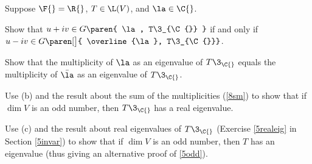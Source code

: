 \exercise
Suppose $\F{} = \R{}$, $T \in \L(V)$, and $\la \in \C{}$.\label{8compmult}
\begin{subtheorem}
\item
Show that $u + iv \in G\paren{ \la, T\3_{\C{}} }$ if and only if $u - iv \in G\paren[\big]{ \overline{\la}, T\3_{\C{}}}$.
\item
Show that the multiplicity of $\la$ as an eigenvalue of $T\3_{\C{}}$ equals the \mbox{multiplicity} of $\bar{\la}$ as an eigenvalue of $T\3_{\C{}}$.
\item
Use (b) and the result about the sum of the multiplicities (\ref{8sm}) to show that if $\dim V$ is an odd number, then $T\3_{\C{}}$ has a real eigenvalue.
\item
Use (c) and the result about real eigenvalues of $T\3_{\C{}}$ (Exercise \ref{5realeig} in Section \ref{5invar}) to show that if $\dim V$ is an odd number, then $T$ has an eigenvalue (thus giving an alternative proof of \ref{5odd}).
\end{subtheorem}


